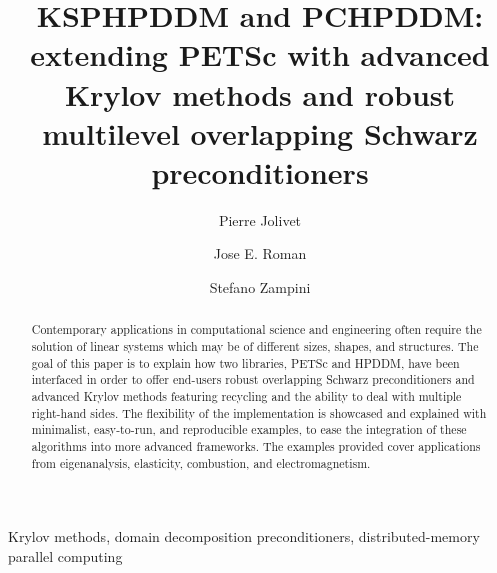 \documentclass[3p,11pt]{elsarticle}
\begin{document}

\begin{frontmatter}

\title{KSPHPDDM and PCHPDDM: extending PETSc with advanced Krylov methods and robust multilevel overlapping Schwarz preconditioners}

\author[firstaddress]{Pierre Jolivet}

\author[secondaryaddress]{Jose E. Roman}

\author[thirdaddress]{Stefano Zampini}

\address[firstaddress]{CNRS, IRIT--ENSEEIHT, Toulouse, France}
\address[secondaryaddress]{Universitat Polit\`ecnica de Val\`encia, Val\`encia, Spain}
\address[thirdaddress]{King Abdullah University of Science and Technology, Thuwal, Saudi Arabia}

\begin{abstract}
  Contemporary applications in computational science and engineering often
    require the solution of linear systems which may be of different sizes,
    shapes, and structures. The goal of this paper is to explain how two
    libraries, PETSc and HPDDM, have been interfaced in order to offer
    end-users robust overlapping Schwarz preconditioners and advanced Krylov
    methods featuring recycling and the ability to deal with multiple right-hand sides.
    The flexibility of the implementation %
    is showcased and explained with minimalist, easy-to-run, and reproducible examples,
    to ease the integration of these algorithms into more advanced frameworks.
    The examples provided cover applications from
    eigenanalysis, elasticity, combustion, and
    electromagnetism.
\end{abstract}

\begin{keyword}
  Krylov methods, domain decomposition preconditioners, distributed-memory parallel computing
\end{keyword}

\end{frontmatter}
\end{document}
